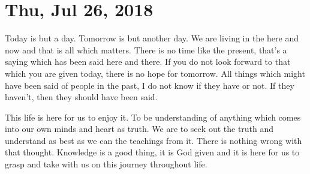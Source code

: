 \section{Thu, Jul 26, 2018}

Today is but a day. Tomorrow is but another day. We are living in the here and now
and that is all which  matters. There is no time like the present, that's a saying
which has been said here and there. If you do not look forward to that which you are
given today, there is no hope for tomorrow. All things which might have been said of
people in the past, I do not know if they have or not. If they haven't, then they
should have been said.

This life is here for us to enjoy it. To be understanding of anything which comes
into our own minds and heart as truth. We are to seek out the truth and understand as
best as we can the teachings from it. There is nothing wrong with that thought.
Knowledge is a good thing, it is God given and it is here for us to grasp and take
with us on this journey throughout life.